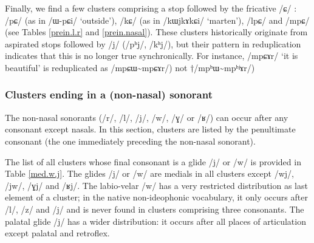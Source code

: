 \documentclass[oneside,a4paper,11pt]{article}
\newcommand{\ipa}[1]{\mbox{\phon/#1/}}
\newcommand{\tld}{\textasciitilde{}}
\newcommand{\resetcounters}[2]{
\newcounter{#1}
\newcounter{#2}
 \setcounter{#1}{\value{2clusters}}
  \setcounter{#2}{\value{3clusters}}
 \setcounter{2clusters}{0}
  \setcounter{3clusters}{0}
}
\begin{document}
 \resetcounters{2nC}{3nC} %
Finally, we find a few clusters comprising a stop followed by the fricative \ipa{ɕ} :  \ipa{pɕ}  (as in \ipa{ɯ-pɕi}  `outside'),  \ipa{kɕ}  (as in \ipa{kɯjkɤkɕi}  `marten'), \ipa{lpɕ} and \ipa{mpɕ} (see Tables \ref{prein.l.r} and  \ref{prein.nasal}). These clusters historically originate from aspirated stops followed by \ipa{j} (\ipa{pʰj}, \ipa{kʰj}), but their pattern in reduplication indicates that this is no longer true synchronically. For instance, \ipa{mpɕɤr} `it is beautiful' is reduplicated as \ipa{mpɕɯ\tld{}mpɕɤr}) not $\dagger$\ipa{mpʰɯ\tld{}mpʰʲɤr}) 

 \subsubsection*{Clusters ending in a (non-nasal) sonorant}   \label{sec:medial}
  The non-nasal sonorants (\ipa{r}, \ipa{l}, \ipa{j}, \ipa{w}, \ipa{ɣ} or \ipa{ʁ}) can occur after any consonant except nasals. In this section, clusters are listed by the penultimate consonant  (the one immediately preceding the non-nasal sonorant).  
  
 The list of all clusters whose final consonant is a glide  \ipa{j} or \ipa{w} is provided in Table \ref{med.w.j}. The glides  \ipa{j} or \ipa{w} are medials in all clusters except \ipa{wj}, \ipa{jw}, \ipa{ɣj} and \ipa{ʁj}. The labio-velar \ipa{w} has a very restricted distribution as last element of a cluster; in the native non-ideophonic vocabulary, it only occurs after \ipa{l}, \ipa{z} and \ipa{j} and is never found in clusters comprising three consonants. The palatal glide \ipa{j} has a wider distribution: it occurs after all places of articulation except palatal and retroflex.
  
\end{document}
